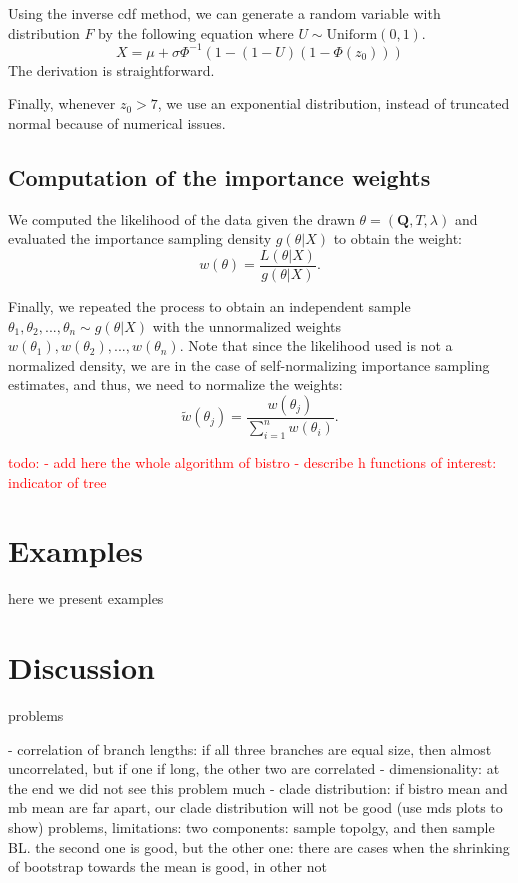 \documentclass[useAMS,usenatbib]{biom}
\newcommand{\falta}[1]{\textcolor{red}{#1}}
\begin{document}
Using the inverse cdf method, we can generate a random variable with distribution $F$
by the following equation where $U \sim \text{Uniform}(0,1)$.
$$
X = \mu + \sigma \Phi^{-1}( 1 - (1-U)(1-\Phi(z_0)))
$$
The derivation is straightforward.

Finally, whenever $z_0>7$, we use an exponential distribution, instead
of truncated normal because of numerical issues.

\subsection{Computation of the importance weights}
We computed the likelihood of the data given the drawn $\theta = (\mathbf{Q}, T,
\lambda)$ and evaluated the importance sampling density $g(\theta|X)$
to obtain the weight:
\begin{equation}
w(\theta) = \frac{L(\theta|X)}{g(\theta|X)}.
\end{equation}

Finally, we repeated the process to obtain an independent sample
$\theta_1, \theta_2,...,\theta_n \sim g(\theta|X)$ with the
unnormalized weights $w(\theta_1), w(\theta_2),...,w(\theta_n)$. Note
that since the likelihood used is not a normalized density, we are in
the case of self-normalizing importance sampling estimates, and thus,
we need to normalize the weights:
\begin{equation}
\tilde{w}(\theta_j) = \frac{w(\theta_j)}{\sum_{i=1}^n w(\theta_i)}.
\end{equation}

\falta{todo:
- add here the whole algorithm of bistro
- describe h functions of interest: indicator of tree}


\section{Examples}
\label{examples}
here we present examples

\section{Discussion}
\label{discussion}
problems

- correlation of branch lengths: if all three branches are equal size,
then almost uncorrelated, but if one if long, the other two are correlated
- dimensionality: at the end we did not see this problem much
- clade distribution: if bistro mean and mb mean are far apart, our
clade distribution will not be good (use mds plots to show)
problems, limitations: two components: sample topolgy, and then
sample BL. the second one is good, but the other one: there are
cases when the shrinking of bootstrap towards the mean is good, in
other not 
\end{document}
